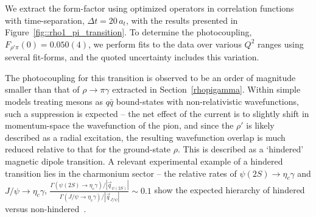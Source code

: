 We extract the form-factor using optimized operators in correlation functions with time-separation, $\Delta t = 20 \,a_t$, with the results presented in Figure~\ref{fig::rho1_pi_transition}. To determine the photocoupling, $F_{\rho' \pi}(0) = 0.050(4)$, we perform fits to the data over various $Q^2$ ranges using several fit-forms, and the quoted uncertainty includes this variation.

The photocoupling for this transition is observed to be an order of magnitude smaller than that of $\rho \to \pi \gamma$ extracted in Section~\ref{rhopigamma}. Within simple models treating mesons as $q\bar{q}$ bound-states with non-relativistic wavefunctions, such a suppression is expected -- the net effect of the current is to slightly shift in momentum-space the wavefunction of the pion, and since the $\rho'$ is likely described as a radial excitation, the resulting wavefunction overlap is much reduced relative to that for the ground-state $\rho$. This is described as a `hindered' magnetic dipole transition. A relevant experimental example of a hindered transition lies in the charmonium sector -- the relative rates of $\psi(2S) \to \eta_c \gamma$ and $J/\psi \to \eta_c \gamma$, $\frac{\Gamma(\psi(2S) \to \eta_c \gamma)/|\vec{q}_{\psi(2S)}|}{\Gamma(J/\psi \to \eta_c \gamma)/|\vec{q}_{J/\psi}|} \sim 0.1$ show the expected hierarchy of hindered versus non-hindered~\cite{PDG-2012}.







